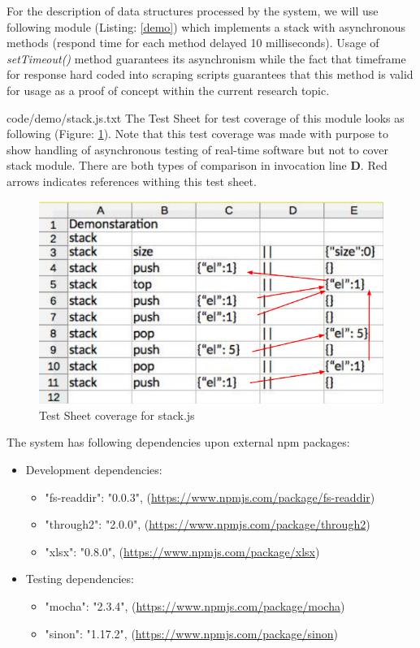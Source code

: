 For the description of data structures processed by the system, we will use following module (Listing: \ref{demo}) which implements a stack with asynchronous methods (respond time for each method delayed 10 milliseconds). Usage of \textit{setTimeout()} method guarantees its asynchronism while the fact that timeframe for response hard coded into scraping scripts guarantees that this method is valid for usage as a proof of concept within the current research topic.

{code/demo/stack.js.txt}
The Test Sheet for test coverage of this module looks as following (Figure: \ref{fig:demoTS}). Note that this test coverage was made with purpose to show handling of asynchronous testing of real-time software but not to cover stack module. There are both types of comparison in invocation line \textbf{D}. Red arrows indicates references withing this test sheet.
\begin{figure}[H]
\centering
\includegraphics[width=\linewidth]{grafiken/demoTS.pdf}
\caption{Test Sheet coverage for stack.js}
\label{fig:demoTS}
\end{figure}


The system has following dependencies upon external npm packages:
\begin{itemize}
	\item Development dependencies:
	\begin{itemize}
		\item  "fs-readdir": "0.0.3", (\url{https://www.npmjs.com/package/fs-readdir})
		\item "through2": "2.0.0", (\url{https://www.npmjs.com/package/through2})
		\item "xlsx": "0.8.0", (\url{https://www.npmjs.com/package/xlsx})
	\end{itemize}
	\item Testing dependencies:
	\begin{itemize}
		\item "mocha": "2.3.4", (\url{https://www.npmjs.com/package/mocha})
		\item "sinon": "1.17.2", (\url{https://www.npmjs.com/package/sinon})
	\end{itemize}



\end{itemize}

